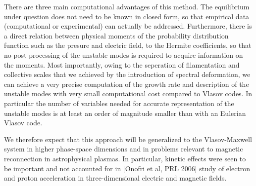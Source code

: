 \documentclass[a4paper,10pt]{article}
\begin{document}
There are three main computational advantages of this method. 
The equilibrium under question does not need to be known in closed form, 
so that empirical data (computational or experimental) 
can actually be addressed. Furthermore, there is a direct relation between
physical moments of the probability distribution function such as the presure
and electric field, to the Hermite coefficients, so that no post-processing
of the unstable modes is required to acquire information on the moments. Most
importantly, owing to the seperation of filamentation and collective scales
that we achieved by the introduction of spectral deformation, we can achieve
a very precise computation of the growth rate and
description of the unstable modes with very small computational cost
compared to Vlasov codes. In particular the number of variables needed for
accurate representation of the unstable modes is at least an order of magnitude
smaller than with an Eulerian Vlasov code.

We therefore expect that this approach will be generalized to the Vlasov-Maxwell
system in higher phase-space dimensions and in problems relevant to magnetic
reconnection in astrophysical plasmas. 
In particular, kinetic effects were seen to be important and not accounted
for in [Onofri et al, PRL 2006] study of electron and proton acceleration 
in three-dimensional electric and magnetic fields. 






\end{document}
